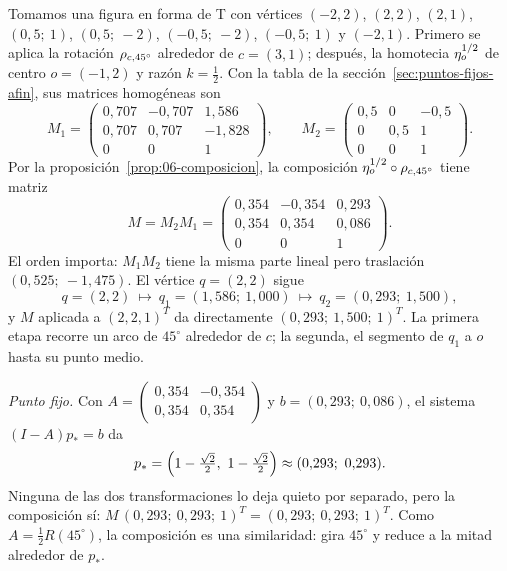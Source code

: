 \begin{ejemplo}\label{ej:06-rot-escala}
Tomamos una figura en forma de T con vértices \((-2,2)\), \((2,2)\), \((2,1)\),
\((0{,}5;\ 1)\), \((0{,}5;\ -2)\), \((-0{,}5;\ -2)\), \((-0{,}5;\ 1)\) y \((-2,1)\). Primero se aplica la rotación \(\rho_{c,45^\circ}\) alrededor de \(c=(3,1)\); después, la
homotecia \(\eta_{o}^{1/2}\) de centro \(o=(-1,2)\) y razón \(k=\tfrac12\). Con la tabla de la
sección~\ref{sec:puntos-fijos-afin}, sus matrices homogéneas son
\[
M_1=
\begin{pmatrix}
0{,}707&-0{,}707&1{,}586\\
0{,}707&0{,}707&-1{,}828\\
0&0&1
\end{pmatrix},
\qquad
M_2=
\begin{pmatrix}
0{,}5&0&-0{,}5\\
0&0{,}5&1\\
0&0&1
\end{pmatrix}.
\]
Por la proposición~\ref{prop:06-composicion}, la composición \(\eta_{o}^{1/2}\circ\rho_{c,45^\circ}\)
tiene matriz
\[
M=M_2M_1=
\begin{pmatrix}
0{,}354&-0{,}354&0{,}293\\
0{,}354&0{,}354&0{,}086\\
0&0&1
\end{pmatrix}.
\]
El orden importa: \(M_1M_2\) tiene la misma parte lineal pero traslación \((0{,}525;\ -1{,}475)\).
El vértice \(q=(2,2)\) sigue
\[
  q=(2,2)\ \longmapsto\ q_1=(1{,}586;\ 1{,}000)\ \longmapsto\ q_2=(0{,}293;\ 1{,}500),
\]
y \(M\) aplicada a \((2,2,1)^T\) da directamente \((0{,}293;\ 1{,}500;\ 1)^T\). La primera
etapa recorre un arco de \(45^\circ\) alrededor de \(c\); la segunda, el segmento de \(q_1\)
a \(o\) hasta su punto medio.

\emph{Punto fijo.} Con \(A=\begin{pmatrix}0{,}354&-0{,}354\\0{,}354&0{,}354\end{pmatrix}\) y
\(b=(0{,}293;\ 0{,}086)\), el sistema \((I-A)p_\ast=b\) da
\[
  p_\ast=\Bigl(1-\tfrac{\sqrt2}{2},\ 1-\tfrac{\sqrt2}{2}\Bigr)\approx(0{,}293;\ 0{,}293).
\]
Ninguna de las dos transformaciones lo deja quieto por separado, pero la composición sí:
\(M\,(0{,}293;\ 0{,}293;\ 1)^T=(0{,}293;\ 0{,}293;\ 1)^T\). Como \(A=\tfrac12R(45^\circ)\), la
composición es una similaridad: gira \(45^\circ\) y reduce a la mitad alrededor de \(p_\ast\).
\end{ejemplo}

